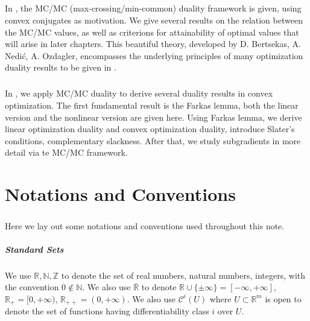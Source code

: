 \paragraph{}In , the MC/MC (max-crossing/min-common) duality framework is given, using convex conjugates as motivation. We give several results on the relation between the MC/MC values, as well as criterions for attainability of optimal values that will arise in later chapters. This beautiful theory, developed by D. Bertsekas, A. Nedi\'{c}, A. Ozdagler, encompasses the underlying principles of many optimization duality results to be given in .

\paragraph{}In , we apply MC/MC duality to derive several duality results in convex optimization. The first fundamental result is the Farkas lemma, both the linear version and the nonlinear version are given here. Using Farkas lemma, we derive linear optimization duality and convex optimization duality, introduce Slater's conditions, complementary slackness. After that, we study subgradients in more detail via te MC/MC framework.

\chapter*{Notations and Conventions}

\paragraph{}Here we lay out some notations and conventions used throughout this note.

\paragraph{Standard Sets}We use $\mathbb{R,N,Z}$ to denote the set of real numbers, natural numbers, integers, with the convention $0\notin \mathbb{N}$. We also use $\overline{\mathbb{R}}$ to denote $\mathbb{R}\cup\{\pm\infty\}=[-\infty,+\infty]$, $\mathbb{R}_{+}=[0,+\infty)$, $\mathbb{R}_{++}=(0,+\infty)$. We also use $\mathscr{C}^i(U)$ where $U\subset \mathbb{R}^m$ is open to denote the set of functions having differentiability class $i$ over $U$.

